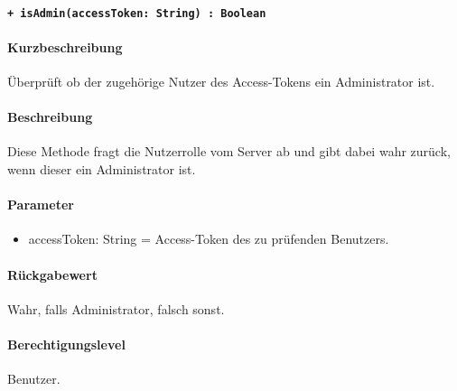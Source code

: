 \paragraph{\texttt{+ isAdmin(accessToken: String) : Boolean}}\label{AP_Backend_isAdmin}%
\paragraph*{Kurzbeschreibung}
Überprüft ob der zugehörige Nutzer des Access-Tokens ein Administrator ist.
\paragraph*{Beschreibung}
Diese Methode fragt die Nutzerrolle vom Server ab und gibt dabei wahr zurück, wenn dieser ein Administrator ist.
\paragraph*{Parameter}
\begin{itemize}
    \item accessToken: String = Access-Token des zu prüfenden Benutzers.
\end{itemize}
\paragraph*{Rückgabewert}
Wahr, falls Administrator, falsch sonst.
\paragraph*{Berechtigungslevel}
Benutzer.